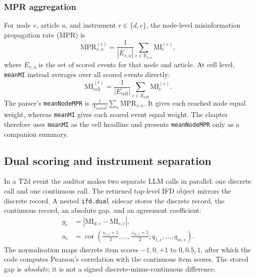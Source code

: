 \subsubsection{MPR aggregation}
\label{sec:mm-mpr}

For node \(v\), article \(a\), and instrument \(r\in\{d,c\}\), the node-level
misinformation propagation rate (MPR) is
\begin{equation}
  \mathrm{MPR}^{(r)}_{v,a}
  =\frac{1}{|E_{v,a}|}\sum_{e\in E_{v,a}}\mathrm{MI}^{(r)}_e,
  \label{eq:mm-node-mpr}
\end{equation}
where \(E_{v,a}\) is the set of scored events for that node and article.  At cell level,
\texttt{meanMI} instead averages over all scored events directly:
\begin{equation}
  \overline{\mathrm{MI}}^{(r)}_{\mathrm{cell}}
  =\frac{1}{|E_{\mathrm{cell}}|}
   \sum_{e\in E_{\mathrm{cell}}}\mathrm{MI}^{(r)}_e.
  \label{eq:cell-mi}
\end{equation}
The parser's \texttt{meanNodeMPR} is
\(\frac{1}{|V_{\mathrm{scored}}|}\sum_v\mathrm{MPR}_{v,a}\).  It gives each reached
node equal weight, whereas \texttt{meanMI} gives each scored event equal weight.
The chapter therefore uses \texttt{meanMI} as the cell headline and presents
\texttt{meanNodeMPR} only as a companion summary.

\subsection{Dual scoring and instrument separation}
\label{sec:mm-dual}

In a T2d event the auditor makes two separate LLM calls in parallel: one discrete
call and one continuous call.  The returned top-level IFD object mirrors the discrete
record.  A nested \texttt{ifd.dual} sidecar stores the discrete record, the continuous
record, an absolute gap, and an agreement coefficient:
\begin{align}
  g_e
    &=\left|\mathrm{MI}_{d,e}-\mathrm{MI}_{c,e}\right|,\\
  a_e
    &=\operatorname{cor}\!\left(
       \frac{s_{1,e}+1}{2},\ldots,\frac{s_{m,e}+1}{2};
       q_{1,e},\ldots,q_{m,e}\right).
\end{align}
The normalisation maps discrete item scores \(-1,0,+1\) to \(0,0.5,1\), after which
the code computes Pearson's correlation with the continuous item scores.  The stored
gap is \emph{absolute}; it is not a signed discrete-minus-continuous difference.

